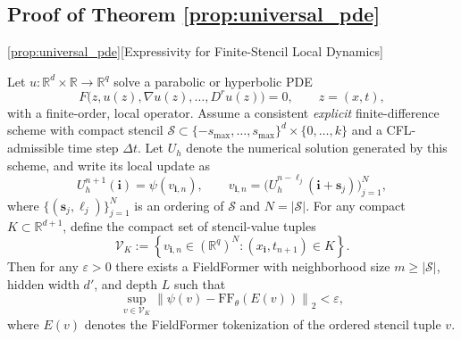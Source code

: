 \subsection{Proof of Theorem \ref{prop:universal_pde}}
\begin{restatedtheorem}{\ref{prop:universal_pde}}[Expressivity for Finite-Stencil Local Dynamics]

Let $u:\mathbb{R}^{d}\times\mathbb{R}\to\mathbb{R}^q$ solve a parabolic or hyperbolic PDE
\[
F\bigl(z,u(z),\nabla u(z),\ldots,D^r u(z)\bigr)=0,\qquad z=(x,t),
\]
with a finite-order, local operator. Assume a consistent \emph{explicit} finite-difference scheme
with compact stencil $\mathcal{S}\subset\{-s_{\max},\ldots,s_{\max}\}^d\times\{0,\ldots,k\}$ and a
CFL-admissible time step $\Delta t$. Let $U_h$ denote the numerical solution generated by this scheme, and write its local update as
\[
U_h^{n+1}(\mathbf{i})=\psi(v_{\mathbf{i},n}),\qquad
v_{\mathbf{i},n}
=
\bigl(U_h^{n-\ell_j}(\mathbf{i}+\mathbf{s}_j)\bigr)_{j=1}^{N},
\]
where $\{(\mathbf{s}_j,\ell_j)\}_{j=1}^{N}$ is an ordering of $\mathcal{S}$ and $N=|\mathcal{S}|$. For any compact $K\subset\mathbb{R}^{d+1}$, define the compact set of stencil-value tuples
\[
\mathcal{V}_K
:=
\left\{
v_{\mathbf{i},n}\in(\mathbb{R}^{q})^{N}
:
(x_{\mathbf{i}},t_{n+1})\in K
\right\}.
\]
Then for any $\varepsilon>0$ there exists a FieldFormer with neighborhood size $m\ge|\mathcal{S}|$, hidden width $d'$, and depth $L$ such that
\[
\sup_{v\in\mathcal{V}_K}
\left\|
\psi(v)-\mathrm{FF}_{\theta}(E(v))
\right\|_2
<\varepsilon,
\]
where $E(v)$ denotes the FieldFormer tokenization of the ordered stencil tuple $v$.
\end{restatedtheorem}


